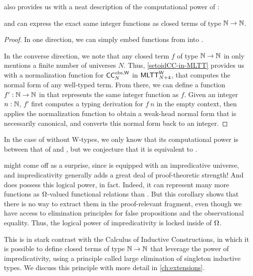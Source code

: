  also provides us with a neat description of the
computational power of \SetoidCCW:

\begin{corollary}\label{integer-functions}
  \SetoidCCW and \MLTTW can express the exact same integer functions
  as closed terms of type \( {\mathbb{N}} \to {\mathbb{N}} \).
\end{corollary}

\begin{proof}
  In one direction, we can simply embed functions from \MLTTW into \SetoidCCW.

  In the converse direction, we note that any closed term \( f \) of
  type \( {\mathbb{N}} \to {\mathbb{N}} \) in \SetoidCCW only mentions a finite number of
  universes \( N \).
  Thus, \cref{setoidCC-in-MLTT} provides us with a normalization function for 
  \( \mathsf{CC}^{\mathrm{obs}, \mathsf{W}}_N \) in \( \mathsf{MLTT}^\mathsf{W}_{N+4} \), that computes the normal form of any 
  well-typed term. 
  From there, we can define a function \( f' : {\mathbb{N}} \to {\mathbb{N}} \) in \MLTTW
  that represents the same integer function as \( f \).
  Given an integer \( n : \mathbb{N} \), \( f' \) first computes a \SetoidCCW typing 
  derivation for \( f\ n \) in the empty context, then applies the 
  normalization function to obtain a weak-head normal form that is necessarily
  canonical, and converts this normal form back to an integer.
\end{proof}
%
In the case of \SetoidCC without \( \mathrm{W} \)-types, we only know that its
computational power is between that of \MLTT and \MLTTW, but we conjecture that
it is equivalent to \MLTT.

 might come off as a surprise, since \SetoidCC is 
equipped with an impredicative universe, and impredicativity generally adds
a great deal of proof-theoretic strength!
%
And \SetoidCC does possess this logical power, in fact. Indeed, it can
represent many more functions as \( \Omega \)-valued functional relations
than \MLTT. But this corollary shows that there is no way to extract them
in the proof-relevant fragment, even though we have access to elimination
principles for false propositions and the observational equality.
%
Thus, the logical power of impredicativity is locked inside of \( \Omega \).

This is in stark contrast with the Calculus of Inductive Constructions,
in which it is possible to define closed terms of type \( {\mathbb{N}} \to {\mathbb{N}} \) that leverage
the power of impredicativity, using a principle called large elimination
of singleton inductive types.
%
We discuss this principle with more detail in \cref{ch:extensions}.

